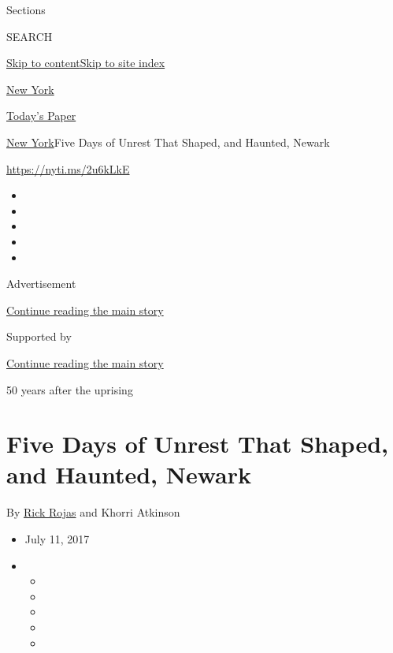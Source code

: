 Sections

SEARCH

\protect\hyperlink{site-content}{Skip to
content}\protect\hyperlink{site-index}{Skip to site index}

\href{https://www.nytimes.com/section/nyregion}{New York}

\href{https://myaccount.nytimes.com/auth/login?response_type=cookie\&client_id=vi}{}

\href{https://www.nytimes.com/section/todayspaper}{Today's Paper}

\href{/section/nyregion}{New York}\textbar{}Five Days of Unrest That
Shaped, and Haunted, Newark

\url{https://nyti.ms/2u6kLkE}

\begin{itemize}
\item
\item
\item
\item
\item
\end{itemize}

Advertisement

\protect\hyperlink{after-top}{Continue reading the main story}

Supported by

\protect\hyperlink{after-sponsor}{Continue reading the main story}

50 years after the uprising

\hypertarget{five-days-of-unrest-that-shaped-and-haunted-newark}{%
\section{Five Days of Unrest That Shaped, and Haunted,
Newark}\label{five-days-of-unrest-that-shaped-and-haunted-newark}}

By \href{http://www.nytimes.com/by/rick-rojas}{Rick Rojas} and Khorri
Atkinson

\begin{itemize}
\item
  July 11, 2017
\item
  \begin{itemize}
  \item
  \item
  \item
  \item
  \item
  \end{itemize}
\end{itemize}

